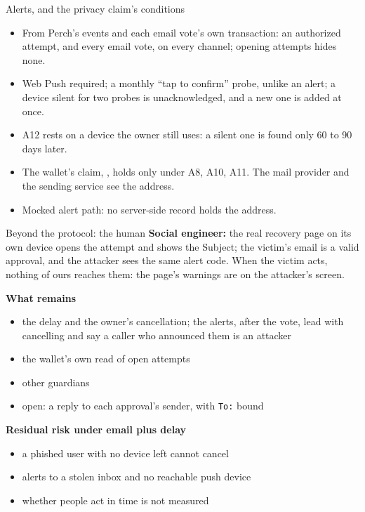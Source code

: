\documentclass[aspectratio=169,11pt]{beamer}
\begin{document}
\begin{frame}{Alerts, and the privacy claim's conditions}
  \small
  \begin{itemize}
    \item From Perch's events and each email vote's own transaction: an
      authorized attempt, and every email vote, on every channel; opening
      attempts hides none.
    \item Web Push required; a monthly ``tap to confirm'' probe, unlike an
      alert; a device silent for two probes is unacknowledged, and a new one
      is added at once.
    \item A12 rests on a device the owner still uses: a silent one is found
      only 60 to 90 days later.
    \item The wallet's claim, \PrivacyClaim, holds only under A8, A10,
      A11. The mail provider and the sending
      service see the address.
    \item Mocked alert path: no server-side record holds the
      address.
  \end{itemize}
\end{frame}

\begin{frame}{Beyond the protocol: the human}
  \small
  \textbf{Social engineer:} the real recovery page on its own device opens
  the attempt and shows the Subject; the victim's email is a valid approval,
  and the attacker sees the same alert code. When the victim acts, nothing
  of ours reaches them: the page's warnings are on the attacker's
  screen.\par\medskip
  \textbf{What remains}
  \begin{itemize}
    \item the delay and the owner's cancellation; the alerts, after the vote,
      lead with cancelling and say a caller who announced them is an
      attacker
    \item the wallet's own read of open attempts
    \item other guardians
    \item open: a reply to each approval's sender, with \texttt{To:} bound
  \end{itemize}
  \textbf{Residual risk under email plus delay}
  \begin{itemize}
    \item a phished user with no device left cannot cancel
    \item alerts to a stolen inbox and no reachable push device
    \item whether people act in time is not measured
  \end{itemize}
\end{frame}
\end{document}
